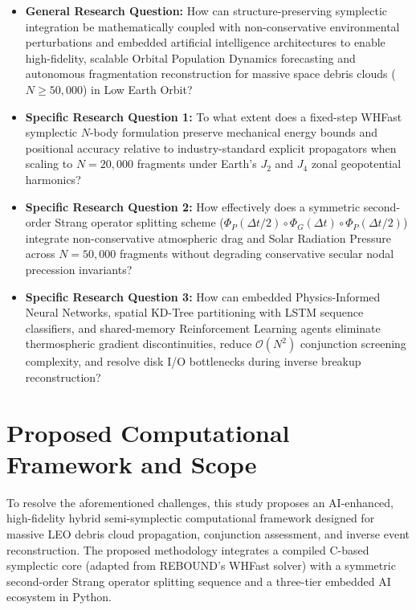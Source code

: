 \begin{itemize}
    \item \textbf{General Research Question:} How can structure-preserving symplectic integration be mathematically coupled with non-conservative environmental perturbations and embedded artificial intelligence architectures to enable high-fidelity, scalable Orbital Population Dynamics forecasting and autonomous fragmentation reconstruction for massive space debris clouds ($N \ge 50,000$) in Low Earth Orbit?
    \item \textbf{Specific Research Question 1:} To what extent does a fixed-step WHFast symplectic $N$-body formulation preserve mechanical energy bounds and positional accuracy relative to industry-standard explicit propagators when scaling to $N = 20,000$ fragments under Earth's $J_2$ and $J_4$ zonal geopotential harmonics?
    \item \textbf{Specific Research Question 2:} How effectively does a symmetric second-order Strang operator splitting scheme ($\Phi_P(\Delta t/2) \circ \Phi_G(\Delta t) \circ \Phi_P(\Delta t/2)$) integrate non-conservative atmospheric drag and Solar Radiation Pressure across $N = 50,000$ fragments without degrading conservative secular nodal precession invariants?
    \item \textbf{Specific Research Question 3:} How can embedded Physics-Informed Neural Networks, spatial KD-Tree partitioning with LSTM sequence classifiers, and shared-memory Reinforcement Learning agents eliminate thermospheric gradient discontinuities, reduce $\mathcal{O}(N^2)$ conjunction screening complexity, and resolve disk I/O bottlenecks during inverse breakup reconstruction?
\end{itemize}

\section{Proposed Computational Framework and Scope}
\label{sec:occupying_niche}

To resolve the aforementioned challenges, this study proposes an AI-enhanced, high-fidelity hybrid semi-symplectic computational framework designed for massive LEO debris cloud propagation, conjunction assessment, and inverse event reconstruction. The proposed methodology integrates a compiled C-based symplectic core (adapted from REBOUND's WHFast solver) with a symmetric second-order Strang operator splitting sequence and a three-tier embedded AI ecosystem in Python.

